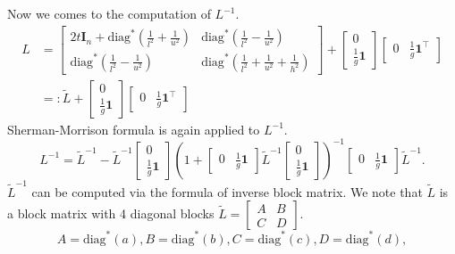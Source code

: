 \documentclass[final,onefignum,onetabnum]{siamart190516}
\begin{document}
Now we comes to the computation of $L^{-1}$.
\begin{equation}
    \begin{aligned}
        L &= \begin{bmatrix} 2t\mathbf{I}_n + \text{diag}^*(\frac{1}{l^2}+\frac{1}{u^2}) &  \text{diag}^*(\frac{1}{l^2}-\frac{1}{u^2})\\
\text{diag}^*(\frac{1}{l^2}-\frac{1}{u^2}) &  \text{diag}^*(\frac{1}{l^2}+\frac{1}{u^2}+\frac{1}{h^2}) \end{bmatrix}+ \begin{bmatrix}
0\\ \frac{1}{g}\mathbf{1}
\end{bmatrix} \begin{bmatrix}
0 &\frac{1}{g}\mathbf{1}^\top
\end{bmatrix}\\
&=: \widetilde{L} + \begin{bmatrix}
0\\ \frac{1}{g}\mathbf{1}
\end{bmatrix} \begin{bmatrix}
0 &\frac{1}{g}\mathbf{1}^\top
\end{bmatrix}
    \end{aligned}
\end{equation}
Sherman-Morrison formula is again applied to $L^{-1}$.
\begin{equation}\label{L_inv}
    L^{-1} = \widetilde{L}^{-1}- \widetilde{L}^{-1}\begin{bmatrix}
0\\ \frac{1}{g}\mathbf{1}
\end{bmatrix}(1+\begin{bmatrix}
0 &\frac{1}{g}\mathbf{1}
\end{bmatrix}\widetilde{L}^{-1}\begin{bmatrix}
0\\ \frac{1}{g}\mathbf{1}
\end{bmatrix})^{-1}\begin{bmatrix}
0 &\frac{1}{g}\mathbf{1}
\end{bmatrix}\widetilde{L}^{-1}.
\end{equation}
$\widetilde{L}^{-1}$ can be computed via the formula of inverse block matrix. We note that $\widetilde{L}$ is a block matrix with 4 diagonal blocks $\widetilde{L} = \begin{bmatrix} A &B\\ C &D\end{bmatrix}$.
\begin{equation}
    A = \text{diag}^*(a), B = \text{diag}^*(b), C = \text{diag}^*(c), D = \text{diag}^*(d),
\end{equation}
\end{document}
